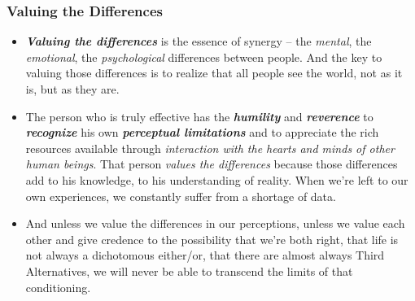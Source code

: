 \documentclass[11pt]{article}
\begin{document}
\subsubsection{Valuing the Differences}
\begin{itemize}
\item \emph{\textbf{Valuing the differences}} is the essence of synergy -- the \emph{mental}, the \emph{emotional}, the \emph{psychological} differences between people. And the key to valuing those differences is to realize that all people see the world, not as it is, but as they are.

\item The person who is truly effective has the \emph{\textbf{humility}} and \emph{\textbf{reverence}} to \emph{\textbf{recognize}} his own \emph{\textbf{perceptual limitations}} and to appreciate the rich resources available through \emph{interaction with the hearts and minds of other human beings}. That person \emph{values the differences} because those differences add to his knowledge, to his understanding of reality. When we're left to our own experiences, we constantly suffer from a shortage of data.

\item And unless we value the differences in our perceptions, unless we value each other and give credence to the possibility that we're both right, that life is not always a dichotomous either/or, that there are almost always Third Alternatives, we will never be able to transcend the limits of that conditioning.
\end{itemize}
\end{document}
